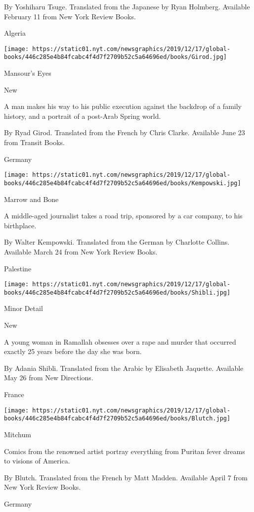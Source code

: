 By Yoshiharu Tsuge. Translated from the Japanese by Ryan Holmberg.
Available February 11 from New York Review Books.

Algeria

\texttt{[image: https://static01.nyt.com/newsgraphics/2019/12/17/global-books/446c285e4b84fcabc4f4d7f2709b52c5a64696ed/books/Girod.jpg]}

Mansour's Eyes

New

A man makes his way to his public execution against the backdrop of a
family history, and a portrait of a post-Arab Spring world.

 By Ryad Girod. Translated from the French by Chris Clarke. Available
June 23 from Transit Books.

Germany

\texttt{[image: https://static01.nyt.com/newsgraphics/2019/12/17/global-books/446c285e4b84fcabc4f4d7f2709b52c5a64696ed/books/Kempowski.jpg]}

Marrow and Bone

A middle-aged journalist takes a road trip, sponsored by a car company,
to his birthplace.

 By Walter Kempowski. Translated from the German by Charlotte Collins.
Available March 24 from New York Review Books.

Palestine

\texttt{[image: https://static01.nyt.com/newsgraphics/2019/12/17/global-books/446c285e4b84fcabc4f4d7f2709b52c5a64696ed/books/Shibli.jpg]}

Minor Detail

New

A young woman in Ramallah obsesses over a rape and murder that occurred
exactly 25 years before the day she was born.

 By Adania Shibli. Translated from the Arabic by Elisabeth Jaquette.
Available May 26 from New Directions.

France

\texttt{[image: https://static01.nyt.com/newsgraphics/2019/12/17/global-books/446c285e4b84fcabc4f4d7f2709b52c5a64696ed/books/Blutch.jpg]}

Mitchum

Comics from the renowned artist portray everything from Puritan fever
dreams to visions of America.

 By Blutch. Translated from the French by Matt Madden. Available April 7
from New York Review Books.

Germany

